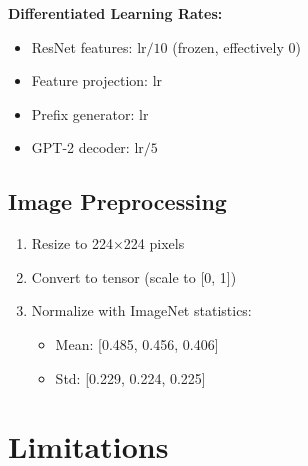 \documentclass[11pt,a4paper]{article}
\begin{document}
\textbf{Differentiated Learning Rates:}
\begin{itemize}[noitemsep]
    \item ResNet features: $\text{lr} / 10$ (frozen, effectively 0)
    \item Feature projection: $\text{lr}$
    \item Prefix generator: $\text{lr}$
    \item GPT-2 decoder: $\text{lr} / 5$
\end{itemize}

\subsection{Image Preprocessing}

\begin{enumerate}[noitemsep]
    \item Resize to 224$\times$224 pixels
    \item Convert to tensor (scale to [0, 1])
    \item Normalize with ImageNet statistics:
    \begin{itemize}[noitemsep]
        \item Mean: [0.485, 0.456, 0.406]
        \item Std: [0.229, 0.224, 0.225]
    \end{itemize}
\end{enumerate}

\section{Limitations}
\end{document}
